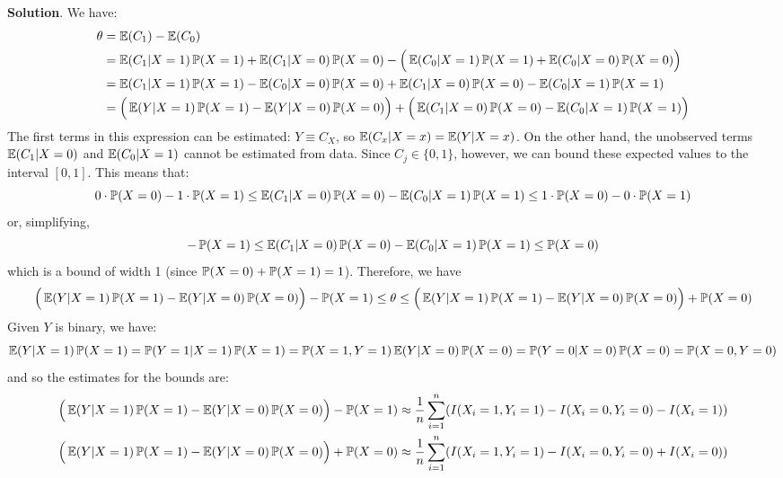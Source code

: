 \textbf{Solution}. We have:
\begin{align*}
\theta &= \EXP(C_{1}) - \EXP(C_{0}) \\
&= \EXP(C_{1} | X = 1) \PROB(X = 1) + \EXP(C_{1} | X = 0) \PROB(X = 0)
 - \Big( \EXP(C_{0} | X = 1) \PROB(X = 1) + \EXP(C_{0} | X = 0) \PROB(X = 0) \Big) \\
&= \EXP(C_{1} | X = 1) \PROB(X = 1) - \EXP(C_{0} | X = 0) \PROB(X = 0)
 + \EXP(C_{1} | X = 0) \PROB(X = 0) - \EXP(C_{0} | X = 1) \PROB(X = 1) \\
&= \Big( \EXP(Y | X = 1) \PROB(X = 1) - \EXP(Y | X = 0) \PROB(X = 0) \Big)
 + \Big( \EXP(C_{1} | X = 0) \PROB(X = 0) - \EXP(C_{0} | X = 1) \PROB(X = 1) \Big)
\end{align*}
The first terms in this expression can be estimated: \(Y \equiv C_X\), so \(\EXP(C_x | X = x) = \EXP(Y | X = x)\). On the other hand, the unobserved terms \(\EXP(C_{1} | X = 0)\) and \(\EXP(C_{0} | X = 1)\) cannot be estimated from data. Since \(C_{j} \in \{0, 1\}\), however, we can bound these expected values to the interval \([0, 1]\). This means that:
\[
0 \cdot \PROB(X = 0) - 1 \cdot \PROB(X = 1) \leq \EXP(C_{1} | X = 0) \PROB(X = 0) - \EXP(C_{0} | X = 1) \PROB(X = 1) \leq 1 \cdot \PROB(X = 0) - 0 \cdot \PROB(X = 1)
\]
or, simplifying,
\[
- \PROB(X = 1) \leq \EXP(C_{1} | X = 0) \PROB(X = 0) - \EXP(C_{0} | X = 1) \PROB(X = 1) \leq \PROB(X = 0) 
\]
which is a bound of width 1 (since \(\PROB(X = 0) + \PROB(X = 1) = 1\)).
Therefore, we have
\[
\Big( \EXP(Y | X = 1) \PROB(X = 1) - \EXP(Y | X = 0) \PROB(X = 0) \Big) - \PROB(X = 1)
 \leq \theta \leq
 \Big( \EXP(Y | X = 1) \PROB(X = 1) - \EXP(Y | X = 0) \PROB(X = 0) \Big) + \PROB(X = 0)
\]
Given \(Y\) is binary, we have:
\[
\EXP(Y | X = 1) \PROB(X = 1) =  \PROB(Y = 1 | X = 1) \PROB(X = 1) =  \PROB(X = 1, Y = 1) \\
\EXP(Y | X = 0) \PROB(X = 0) =  \PROB(Y = 0 | X = 0) \PROB(X = 0) =  \PROB(X = 0, Y = 0)
\]
and so the estimates for the bounds are:
\begin{align*}
\Big( \EXP(Y | X = 1) \PROB(X = 1) - \EXP(Y | X = 0) \PROB(X = 0) \Big) - \PROB(X = 1)
&\approx \frac{1}{n} \sum_{i = 1}^{n} \left( I(X_{i} = 1, Y_{i} = 1) - I(X_{i} = 0, Y_{i} = 0) - I(X_{i} = 1)\right) \\
\Big( \EXP(Y | X = 1) \PROB(X = 1) - \EXP(Y | X = 0) \PROB(X = 0) \Big) + \PROB(X = 0)
&\approx \frac{1}{n} \sum_{i = 1}^{n} \left( I(X_{i} = 1, Y_{i} = 1) - I(X_{i} = 0, Y_{i} = 0) + I(X_{i} = 0)\right)
\end{align*}


